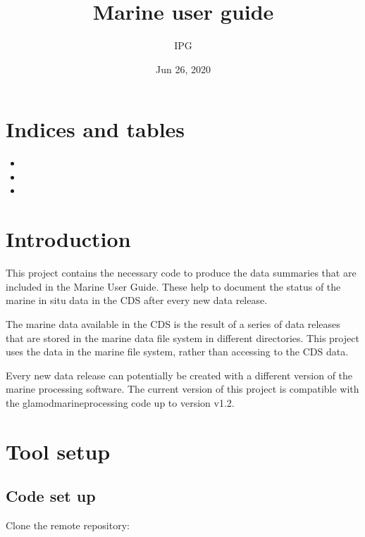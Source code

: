 \documentclass[letterpaper,10pt,english]{sphinxmanual}
\title{Marine user guide}
\date{Jun 26, 2020}
\author{IPG}
\begin{document}
\pagestyle{empty}
\sphinxmaketitle
\pagestyle{plain}
\sphinxtableofcontents
\pagestyle{normal}
\label{\detokenize{index::doc}}



\chapter{Indices and tables}
\label{\detokenize{index:indices-and-tables}}\begin{itemize}
\item {} 

\item {} 

\item {} 

\end{itemize}


\chapter{Introduction}
\label{\detokenize{index:introduction}}
This project contains the necessary code to produce the data summaries that are
included in the Marine User Guide. These help to document the status of the
marine in situ data in the CDS after every new data release.

The marine data available in the CDS is the result of a series of data releases
that are stored in the marine data file system in different directories. This
project uses the data in the marine file system, rather than accessing to the
CDS data.

Every new data release can potentially be created with a different version of
the marine processing software. The current version of this project is
compatible with the glamod\sphinxhyphen{}marine\sphinxhyphen{}processing code up to version v1.2.


\chapter{Tool set\sphinxhyphen{}up}
\label{\detokenize{index:tool-set-up}}

\section{Code set up}
\label{\detokenize{index:code-set-up}}
Clone the remote repository:
\end{document}
